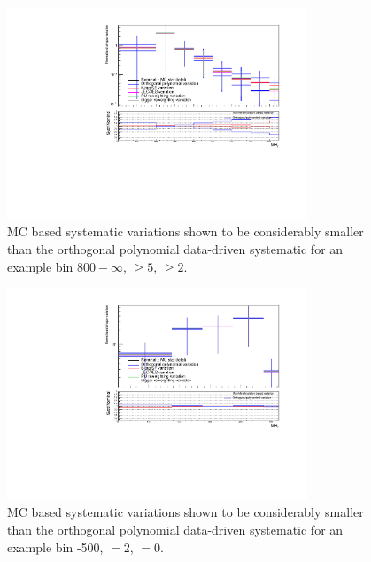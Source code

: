 \begin{figure}[h!]
  \centering
  \includegraphics[width=0.8\textwidth]{Figures/backgroundPrediction/mcComparison6fb/totalSMS-T1tttt_mGluino-1000_mLSP-100_25ns_mht_ge5j_ge3b_800.pdf}
  \caption{\label{fig:mcCompLow} MC based systematic variations shown to be considerably smaller 
  than the orthogonal polynomial data-driven systematic for an example bin \scalht $800-\infty$, \njet $\geq 5$, \nb $\geq 2$.}
\end{figure}
\begin{figure}[h!]
  \centering
  \includegraphics[width=0.8\textwidth]{Figures/backgroundPrediction/mcComparison6fb/totalSMS-T1tttt_mGluino-1000_mLSP-100_25ns_mht_eq2j_eq0b_400.pdf}
  \caption{\label{fig:mcCompHigh} MC based systematic variations shown to be considerably smaller 
  than the orthogonal polynomial data-driven systematic for an example bin -500, \njet $= 2$, \nb $= 0$.}
\end{figure}



